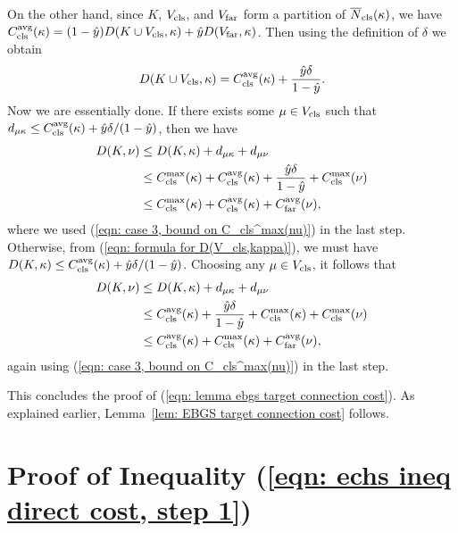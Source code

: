 \documentclass[oneside,final]{ucr}
\begin{document}
\begin{description}
On the other hand, since $K$, $V_{{\mbox{\scriptsize\rm cls}}}$, and $V_{{\mbox{\scriptsize\rm far}}}$ form a partition of ${\overline{N}}_{{\mbox{\scriptsize\rm cls}}}(\kappa)$,
we have
$C_{{\mbox{\scriptsize\rm cls}}}^{{\mbox{\scriptsize\rm avg}}}(\kappa) = (1-\hat{y}) D(K\cup V_{{\mbox{\scriptsize\rm cls}}}, \kappa) + \hat{y} D(V_{{\mbox{\scriptsize\rm far}}}, \kappa)$.
Then using the definition of $\delta$ we obtain
%
\begin{equation}
    D(K \cup V_{\cls}, \kappa) = \clsdist(\kappa) + \frac{\hat{y}\delta}{1-\hat{y}}.
				\label{eqn: formula for D(V_cls,kappa)}
\end{equation}
%
  Now we are essentially done. If there exists some $\mu \in V_{{\mbox{\scriptsize\rm cls}}}$ such
  that $d_{\mu\kappa} \leq C_{{\mbox{\scriptsize\rm cls}}}^{{\mbox{\scriptsize\rm avg}}}(\kappa) +
  \hat{y}\delta/(1-\hat{y})$, then	we have
%
  \begin{align*}
    D(K, \nu) &\leq D(K, \kappa) + d_{\mu\kappa} + d_{\mu\nu} \\
    &\leq C_{{\mbox{\scriptsize\rm cls}}}^{\max}(\kappa) + C_{{\mbox{\scriptsize\rm cls}}}^{{\mbox{\scriptsize\rm avg}}}(\kappa) +
    			\frac{\hat{y}\delta}{1-\hat{y}}
    + C_{{\mbox{\scriptsize\rm cls}}}^{\max}(\nu)\\
    &\leq C_{{\mbox{\scriptsize\rm cls}}}^{\max}(\kappa) + C_{{\mbox{\scriptsize\rm cls}}}^{{\mbox{\scriptsize\rm avg}}}(\kappa) + C_{{\mbox{\scriptsize\rm far}}}^{{\mbox{\scriptsize\rm avg}}}(\nu),
  \end{align*}
%
where we used (\ref{eqn: case 3, bound on C_cls^max(nu)}) in the last step.
  Otherwise, from (\ref{eqn: formula for D(V_cls,kappa)}),
we must have $D(K, \kappa) \leq C_{{\mbox{\scriptsize\rm cls}}}^{{\mbox{\scriptsize\rm avg}}}(\kappa) +
  \hat{y}\delta/(1-\hat{y})$. Choosing any $\mu \in V_{{\mbox{\scriptsize\rm cls}}}$, it follows that
%
  \begin{align*}
    D(K, \nu) &\leq D(K, \kappa) + d_{\mu\kappa} + d_{\mu\nu} \\
    &\leq C_{{\mbox{\scriptsize\rm cls}}}^{{\mbox{\scriptsize\rm avg}}}(\kappa) + \frac{\hat{y}\delta}{1-\hat{y}} +
    		C_{{\mbox{\scriptsize\rm cls}}}^{\max}(\kappa)  + C_{{\mbox{\scriptsize\rm cls}}}^{\max}(\nu)\\
    &\leq C_{{\mbox{\scriptsize\rm cls}}}^{{\mbox{\scriptsize\rm avg}}}(\kappa) + C_{{\mbox{\scriptsize\rm cls}}}^{\max}(\kappa) + C_{{\mbox{\scriptsize\rm far}}}^{{\mbox{\scriptsize\rm avg}}}(\nu),
  \end{align*}
%
again using (\ref{eqn: case 3, bound on C_cls^max(nu)}) in the last step.

\end{description}

This concludes the proof of (\ref{eqn: lemma ebgs target connection cost}).
As explained earlier, Lemma~\ref{lem: EBGS target connection cost} follows.


\vfill

\section{Proof of Inequality  (\ref{eqn: echs ineq direct cost, step 1})}
\label{sec: ECHSinequality}
\end{document}
